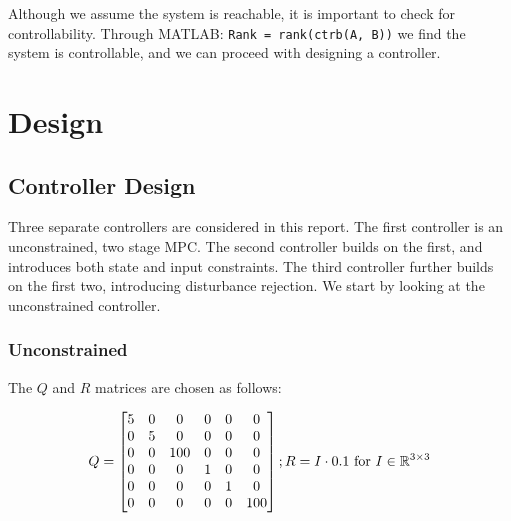 \documentclass[conference, tikz]{IEEEtran}
\begin{document}
Although we assume the system is reachable, it is important to check for controllability. 
Through MATLAB: \verb|Rank = rank(ctrb(A, B))| we find the system is controllable, and we can proceed with designing a controller. 

\section{Design}
\subsection{Controller Design}
Three separate controllers are considered in this report. 
The first controller is an unconstrained, two stage MPC. The second controller builds on the first, and introduces both state and input constraints. The third controller further builds on the first two, introducing disturbance rejection.
We start by looking at the unconstrained controller.
\subsubsection{Unconstrained}
The $Q$ and $R$ matrices are chosen as follows:

\[
    Q = \begin{bmatrix}
        5&0&0&0&0&0 \\
        0&5&0&0&0&0 \\
        0&0&100&0&0&0 \\
        0&0&0&1&0&0 \\
        0&0&0&0&1&0 \\
        0&0&0&0&0&100 \\
    \end{bmatrix}
    ;\\ R = I \cdot 0.1 \text{ for }  I \in \mathbb{R}^{3\times 3}
\]
\end{document}
